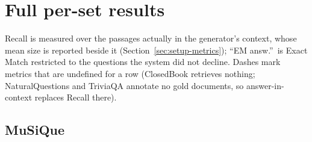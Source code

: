\section{Full per-set results}
\label{app:full-tables}

Recall is measured over the passages actually in the generator's context,
whose mean size is reported beside it (Section~\ref{sec:setup-metrics});
``EM answ.''\ is Exact Match restricted to the questions the system did
not decline. Dashes mark metrics that are undefined for a row (ClosedBook
retrieves nothing; NaturalQuestions and TriviaQA annotate no gold
documents, so answer-in-context replaces Recall there).

\subsection{MuSiQue}
